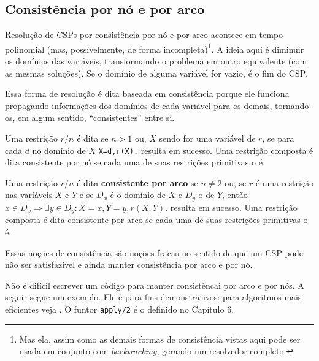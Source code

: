 \documentclass{article}
\begin{document}
\subsection{Consistência por nó e por arco}

Resolução de CSPs por consistência por nó e por arco acontece em tempo polinomial
(mas, possívelmente, de forma incompleta)\footnote{Mas ela, assim como as demais formas de consistência vistas aqui
 pode ser usada em conjunto com \textit{backtracking}, gerando um resolvedor completo.}.
A ideia aqui é diminuir os domínios das variáveis,
transformando o problema em outro equivalente (com as mesmas soluções).
Se o domínio de alguma variável for vazio, é o fim do CSP.

Essa forma de resolução é dita baseada em consistência porque ele funciona propagando informações dos domínios de cada variável
para os demais, tornando-os, em algum sentido, ``consistentes'' entre si.

\begin{definition}
  Uma restrição $r/n$ é dita 
  se $n > 1$ ou, $X$ sendo for uma variável de $r$, se para cada $d$ no domínio
  de $X$ {\tt  X=d,r(X).} resulta em sucesso.
  Uma restrição composta é dita consistente por nó se cada uma de suas restrições
  primitivas o é.
\end{definition}

\begin{definition}
  Uma restrição $r/n$ é dita \textbf{consistente por arco} se
  $n \neq 2$ ou, se $r$ é uma restrição nas variáveis $X$ e $Y$ e se $D_x$ é o domínio de $X$ e $D_y$ o
  de $Y$, então $x \in D_x \Rightarrow \exists y \in D_y : X=x, Y=y, r(X,Y).$ resulta em sucesso.
  Uma restrição composta é dita consistente por arco se cada uma de suas restrições primitivas o é.
\end{definition}

Essas noções de consistência são noções fracas no sentido de que um CSP pode não ser satisfazível
e ainda manter consistência por arco e por nó.

Não é difícil escrever um código para manter consistêncai por arco e por nós. A seguir segue um exemplo. Ele é para fins
demonstrativos: para algoritmos mais eficientes veja \cite{tsang}. O funtor {\tt apply/2} é o definido no Capítulo 6.

\label{lst:no_consistency}
\vspace{2cm}
\end{document}
